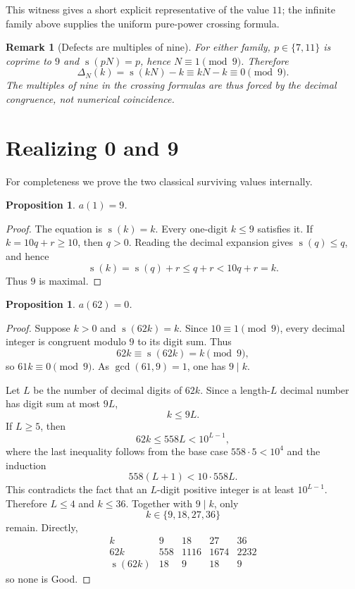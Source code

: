 \documentclass[11pt]{article}
\newtheorem{proposition}[theorem]{Proposition}
\newtheorem{remark}[theorem]{Remark}
\newcommand{\ds}{\operatorname{s}}
\newcommand{\Def}{\Delta}
\begin{document}
This witness gives a short explicit representative of the value $11$; the infinite family above supplies the uniform pure-power crossing formula.

\begin{remark}[Defects are multiples of nine]
For either family, $p\in\{7,11\}$ is coprime to $9$ and $\ds(pN)=p$, hence $N\equiv1\pmod9$.  Therefore
\[
 \Def_N(k)=\ds(kN)-k\equiv kN-k\equiv0\pmod9.
\]
The multiples of nine in the crossing formulas are thus forced by the decimal congruence, not numerical coincidence.
\end{remark}


\section{Realizing 0 and 9}
For completeness we prove the two classical surviving values internally.

\begin{proposition}\label{prop:max9}
$a(1)=9$.
\end{proposition}

\begin{proof}
The equation is $\ds(k)=k$.  Every one-digit $k\le9$ satisfies it.  If $k=10q+r\ge10$, then $q>0$.  Reading the decimal expansion gives $\ds(q)\le q$, and hence
\[
 \ds(k)=\ds(q)+r\le q+r<10q+r=k.
\]
Thus $9$ is maximal.
\end{proof}

\begin{proposition}\label{prop:max0}
$a(62)=0$.
\end{proposition}

\begin{proof}
Suppose $k>0$ and $\ds(62k)=k$.  Since $10\equiv1\pmod9$, every decimal integer is congruent modulo $9$ to its digit sum.  Thus
\[
 62k\equiv\ds(62k)=k\pmod9,
\]
so $61k\equiv0\pmod9$.  As $\gcd(61,9)=1$, one has $9\mid k$.

Let $L$ be the number of decimal digits of $62k$.  Since a length-$L$ decimal number has digit sum at most $9L$,
\[
 k\le9L.
\]
If $L\ge5$, then
\[
 62k\le558L<10^{L-1},
\]
where the last inequality follows from the base case $558\cdot5<10^4$ and the induction
\[
 558(L+1)<10\cdot558L.
\]
This contradicts the fact that an $L$-digit positive integer is at least $10^{L-1}$.  Therefore $L\le4$ and $k\le36$.  Together with $9\mid k$, only
\[
 k\in\{9,18,27,36\}
\]
remain.  Directly,
\[
\begin{array}{c|cccc}
 k&9&18&27&36\\ \hline
 62k&558&1116&1674&2232\\
 \ds(62k)&18&9&18&9
\end{array}
\]
so none is Good.
\end{proof}
\end{document}
